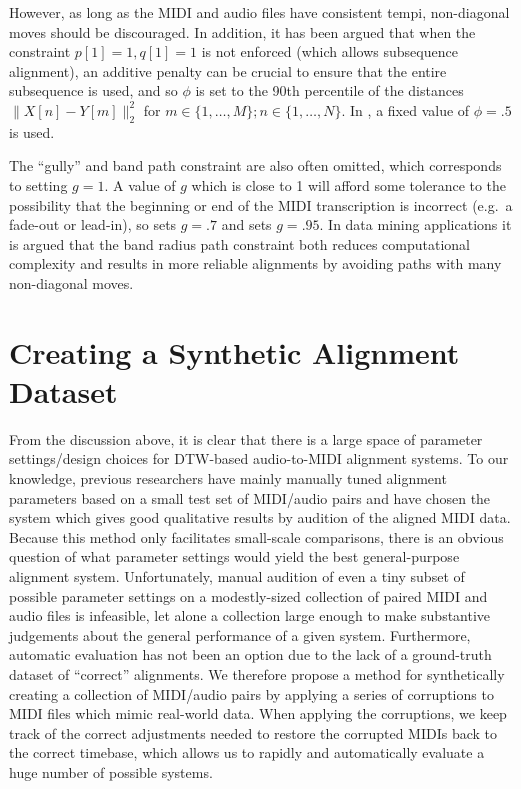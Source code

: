 \documentclass{article}
\begin{document}
\begin{description}[topsep=1pt,itemsep=-1pt,leftmargin=5pt]
However, as long as the MIDI and audio files have consistent tempi, non-diagonal moves should be discouraged.
In addition, it has been argued \cite{raffel2015large} that when the constraint $p[1] = 1, q[1] = 1$ is not enforced (which allows subsequence alignment), an additive penalty can be crucial to ensure that the entire subsequence is used, and so $\phi$ is set to the 90th percentile of the distances $\|X[n] - Y[m]\|_2^2$ for $m \in \{1, \ldots, M\}; n \in \{1, \ldots, N\}$.
In \cite{ellis2013aligning}, a fixed value of $\phi = .5$ is used.
\item[Gully ($g$) and band path constraint:] The ``gully'' and band path constraint are also often omitted, which corresponds to setting $g = 1$.
A value of $g$ which is close to 1 will afford some tolerance to the possibility that the beginning or end of the MIDI transcription is incorrect (e.g.\ a fade-out or lead-in), so \cite{ellis2013aligning} sets $g = .7$ and \cite{raffel2015large} sets $g = .95$.
In data mining applications \cite{ratanamahatana2004everything} it is argued that the band radius path constraint both reduces computational complexity and results in more reliable alignments by avoiding paths with many non-diagonal moves.
\end{description}

\section{Creating a Synthetic Alignment Dataset}
\label{sec:synthetic}

From the discussion above, it is clear that there is a large space of parameter settings/design choices for DTW-based audio-to-MIDI alignment systems.
To our knowledge, previous researchers have mainly manually tuned alignment parameters based on a small test set of MIDI/audio pairs and have chosen the system which gives good qualitative results by audition of the aligned MIDI data.
Because this method only facilitates small-scale comparisons, there is an obvious question of what parameter settings would yield the best general-purpose alignment system.
Unfortunately, manual audition of even a tiny subset of possible parameter settings on a modestly-sized collection of paired MIDI and audio files is infeasible, let alone a collection large enough to make substantive judgements about the general performance of a given system.
Furthermore, automatic evaluation has not been an option due to the lack of a ground-truth dataset of ``correct'' alignments.
We therefore propose a method for synthetically creating a collection of MIDI/audio pairs by applying a series of corruptions to MIDI files which mimic real-world data.
When applying the corruptions, we keep track of the correct adjustments needed to restore the corrupted MIDIs back to the correct timebase, which allows us to rapidly and automatically evaluate a huge number of possible systems.
\end{document}
